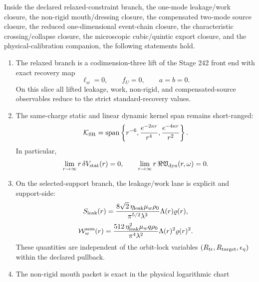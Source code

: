 \begin{theorem}
\label{thm:part08-main}
Inside the declared relaxed-constraint branch, the one-mode leakage/work closure, the non-rigid mouth/dressing closure, the compensated two-mode source closure, the reduced one-dimensional event-chain closure, the characteristic crossing/collapse closure, the microscopic cubic/quintic export closure, and the physical-calibration companion, the following statements hold.
\begin{enumerate}[leftmargin=2.2em]
  \item The relaxed branch is a codimension-three lift of the Stage 242 front end with exact recovery map
  \begin{equation}
  \label{eq:part08-main-recovery-map}
  \ell_w=0,
  \qquad
  f_U=0,
  \qquad
  a=b=0.
  \end{equation}
  On this slice all lifted leakage, work, non-rigid, and compensated-source observables reduce to the strict standard-recovery values.
  \item The same-charge static and linear dynamic kernel span remains short-ranged:
  \begin{equation}
  \label{eq:part08-main-short-range-span}
  \mathcal K_{\rm SR}
  =
  \operatorname{span}\left\{
  r^{-6},
  \frac{e^{-2\kappa r}}{r^4},
  \frac{e^{-4\kappa r}}{r^2}
  \right\}.
  \end{equation}
  In particular,
  \begin{equation}
  \label{eq:part08-main-short-range-limits}
  \lim_{r\to\infty}r\,\delta V_{\rm stat}(r)=0,
  \qquad
  \lim_{r\to\infty}r\,\Re\mathfrak V_{\rm dyn}(r,\omega)=0.
  \end{equation}
  \item On the selected-support branch, the leakage/work lane is explicit and support-side:
  \begin{equation}
  \label{eq:part08-main-leak-support}
  S_{\rm leak}(r)
  =
  \frac{8\sqrt2\,\eta_{\rm leak}\mu_w\rho_0}{\pi^{5/2}\lambda^3}
  \Lambda(r)\varrho(r),
  \end{equation}
  \begin{equation}
  \label{eq:part08-main-work-support}
  \mathcal W_w^{\rm sess}(r)
  =
  \frac{512\,\eta_{\rm leak}^{2}\mu_w q\rho_0}{\pi^4\lambda^2}
  \Lambda(r)^2\varrho(r)^2.
  \end{equation}
  These quantities are independent of the orbit-lock variables \((R_{\rm tr},R_{\rm target},\epsilon_\eta)\) within the declared pullback.
  \item The non-rigid mouth packet is exact in the physical logarithmic chart

\end{enumerate}
\end{theorem}
